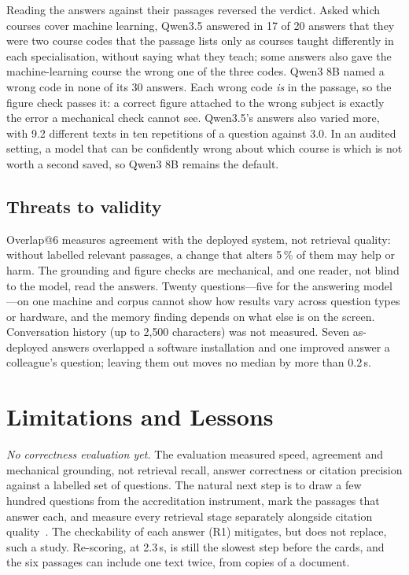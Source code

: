 \documentclass[conference]{IEEEtran}
\begin{document}
Reading the answers against their passages reversed the verdict. Asked which
courses cover machine learning, Qwen3.5 answered in 17 of 20 answers that they
were two course codes that the passage lists only as courses taught
differently in each specialisation, without saying what they teach; some
answers also gave the machine-learning course the wrong one of the three codes.
Qwen3 8B named a wrong code in none of its 30 answers.
Each wrong code \emph{is} in the passage, so the figure check passes it: a
correct figure attached to the wrong subject is exactly the error a mechanical
check cannot see. Qwen3.5's answers also varied more, with 9.2 different texts
in ten repetitions of a question against 3.0. In an audited setting, a model
that can be confidently wrong about which course is which is not worth a
second saved, so Qwen3 8B remains the default.

\subsection{Threats to validity}
Overlap@6 measures agreement with the deployed system, not retrieval quality:
without labelled relevant passages, a change that alters 5\,\% of them may help
or harm. The grounding and figure checks are mechanical, and one reader, not
blind to the model, read the answers. Twenty questions---five for the
answering model---on one machine and corpus cannot show how results vary
across question types or hardware, and the memory finding depends on what else
is on the screen. Conversation history (up to 2{,}500 characters) was not
measured. Seven as-deployed answers overlapped a software installation and one
improved answer a colleague's question; leaving them out moves no median by
more than 0.2\,s.

\section{Limitations and Lessons}
\label{sec:limits}

\emph{No correctness evaluation yet.} The evaluation measured speed,
agreement and mechanical grounding, not retrieval recall, answer correctness
or citation precision against a labelled set of questions. The natural next
step is to draw a few hundred questions from the accreditation instrument,
mark the passages that answer each, and measure every retrieval stage
separately alongside citation quality~\cite{alce}. The checkability of each
answer (R1) mitigates, but does not replace, such a study. Re-scoring, at
2.3\,s, is still the slowest step before the cards, and the six passages can
include one text twice, from copies of a document.
\end{document}
